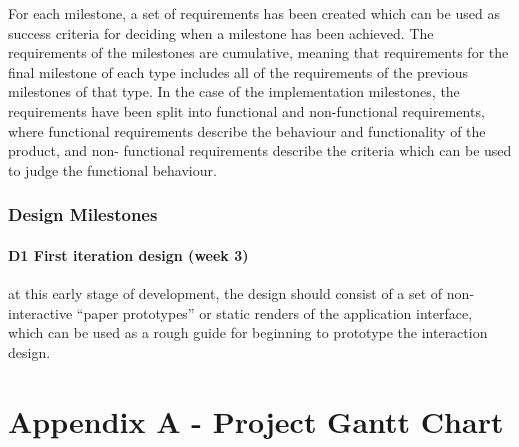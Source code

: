\documentclass[12pt,a4paper]{article}
\begin{document}
For each milestone, a set of requirements has been created which can be used as
success criteria for deciding when a milestone has been achieved. The
requirements of the milestones are cumulative, meaning that requirements for the
final milestone of each type includes all of the requirements of the previous
milestones of that type. In the case of the implementation milestones, the
requirements have been split into functional and non-functional requirements,
where functional requirements describe the behaviour and functionality of the
product, and non- functional requirements describe the criteria which can be
used to judge the functional behaviour.

\subsubsection{Design Milestones}

\paragraph{D1 First iteration design (week 3)} at this early stage of
development, the design should consist of a set of non-interactive ``paper
prototypes'' or static renders of the application interface, which can be used
as a rough guide for beginning to prototype the interaction design.

\newpage
\section{Appendix A - Project Gantt Chart}
\end{document}
